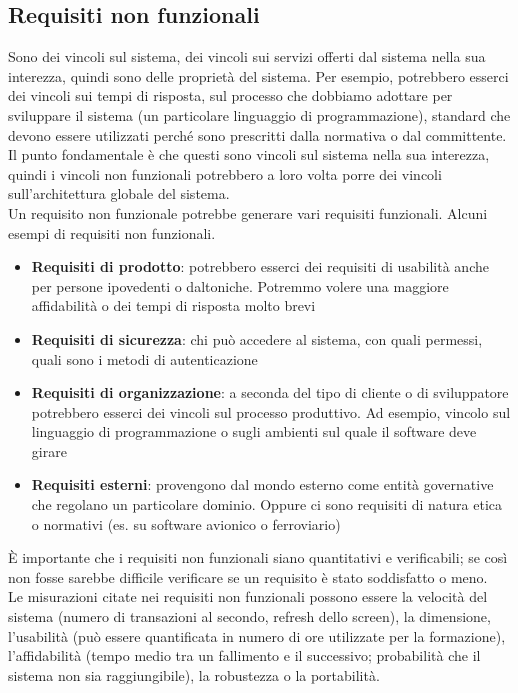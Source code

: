 \subsection{Requisiti non funzionali}
Sono dei vincoli sul sistema, dei vincoli sui servizi offerti dal sistema nella sua interezza, quindi sono delle proprietà del sistema.
Per esempio, potrebbero esserci dei vincoli sui tempi di risposta, sul processo che dobbiamo adottare per sviluppare il sistema (un particolare linguaggio di programmazione), standard che devono essere utilizzati perché sono prescritti dalla normativa o dal committente.\\
Il punto fondamentale è che questi sono vincoli sul sistema nella sua interezza, quindi i vincoli non funzionali potrebbero a loro volta porre dei vincoli sull'architettura globale del sistema.\\
Un requisito non funzionale potrebbe generare vari requisiti funzionali.
Alcuni esempi di requisiti non funzionali.
\begin{itemize}[noitemsep]
    \item \textbf{Requisiti di prodotto}: potrebbero esserci dei requisiti di usabilità anche per persone ipovedenti o daltoniche. Potremmo volere una maggiore affidabilità o dei tempi di risposta molto brevi
    \item \textbf{Requisiti di sicurezza}: chi può accedere al sistema, con quali permessi, quali sono i metodi di autenticazione
    \item \textbf{Requisiti di organizzazione}: a seconda del tipo di cliente o di sviluppatore potrebbero esserci dei vincoli sul processo produttivo. Ad esempio, vincolo sul linguaggio di programmazione o sugli ambienti sul quale il software deve girare
    \item \textbf{Requisiti esterni}: provengono dal mondo esterno come entità governative che regolano un particolare dominio. Oppure ci sono requisiti di natura etica o normativi (es. su software avionico o ferroviario)
\end{itemize}
È importante che i requisiti non funzionali siano quantitativi e verificabili; se così non fosse sarebbe difficile verificare se un requisito è stato soddisfatto o meno.\\
Le misurazioni citate nei requisiti non funzionali possono essere la velocità del sistema (numero di transazioni al secondo, refresh dello screen), la dimensione, l'usabilità (può essere quantificata in numero di ore utilizzate per la formazione), l'affidabilità (tempo medio tra un fallimento e il successivo; probabilità che il sistema non sia raggiungibile), la robustezza o la portabilità.

